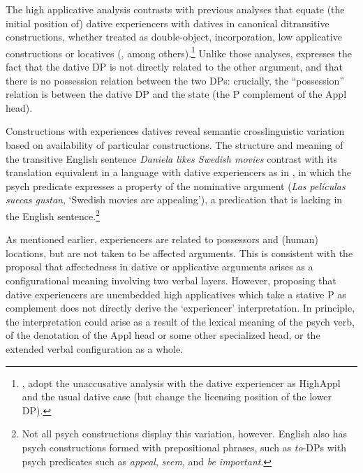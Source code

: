 \documentclass[output=paper,colorlinks,citecolor=brown,modfonts,nonflat]{langsci/langscibook}
\begin{document}







The high applicative analysis contrasts with previous analyses that equate (the initial position of) dative experiencers with datives in canonical ditransitive constructions, whether treated as double-object, incorporation, low applicative constructions or locatives (\citealt{BellettiRizzi1988, Masullo1992thesis}, among others).\footnote{\citealt{Acedo-MatellánMateu2015}, \citealt{Pujalte2015} adopt the unaccusative analysis with the dative experiencer as HighAppl and the usual dative case (but change the licensing position of the lower DP).}   Unlike those analyses,  expresses the fact that the dative DP is not directly related to the other argument, and that there is no possession relation between the two DPs: crucially, the “possession” relation is between the dative DP and the state (the {\liv}P complement of the Appl head).

{Constructions with experiences datives } reveal semantic crosslinguistic variation based on availability of particular constructions. The structure and meaning of the transitive English sentence \textit{Daniela likes Swedish movies} contrast with its translation equivalent in a language with dative experiencers as in , in which the psych predicate expresses a property of the nominative argument (\textit{Las películas suecas gustan}, ‘Swedish movies are appealing’), a predication that is lacking in the English sentence.\footnote{Not all psych constructions display this variation, however. English also has psych constructions formed with prepositional phrases, such as \textit{to}-DPs with psych predicates such as \textit{appeal}, \textit{seem}, and \textit{be important}.}

\largerpage
As mentioned earlier, experiencers are related to possessors and (human) locations, but are not taken to be affected arguments. This is consistent with the proposal that affectedness in dative or applicative arguments arises as a configurational meaning involving two verbal layers. However, proposing that dative experiencers are unembedded high applicatives which take a stative {\liv}P as complement does not directly derive the ‘experiencer’ interpretation. In principle, the interpretation could arise as a result of the lexical meaning of the psych verb, of the denotation of the Appl head or some other specialized head, or the extended verbal configuration as a whole.
\end{document}
